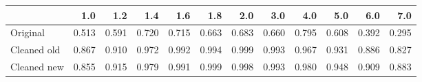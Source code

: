 \begin{tabular}{lrrrrrrrrrrr}
\toprule
{} &   1.0 &   1.2 &   1.4 &   1.6 &   1.8 &   2.0 &   3.0 &   4.0 &   5.0 &   6.0 &   7.0 \\
\midrule
Original    & 0.513 & 0.591 & 0.720 & 0.715 & 0.663 & 0.683 & 0.660 & 0.795 & 0.608 & 0.392 & 0.295 \\
Cleaned old & 0.867 & 0.910 & 0.972 & 0.992 & 0.994 & 0.999 & 0.993 & 0.967 & 0.931 & 0.886 & 0.827 \\
Cleaned new & 0.855 & 0.915 & 0.979 & 0.991 & 0.999 & 0.998 & 0.993 & 0.980 & 0.948 & 0.909 & 0.883 \\
\bottomrule
\end{tabular}
